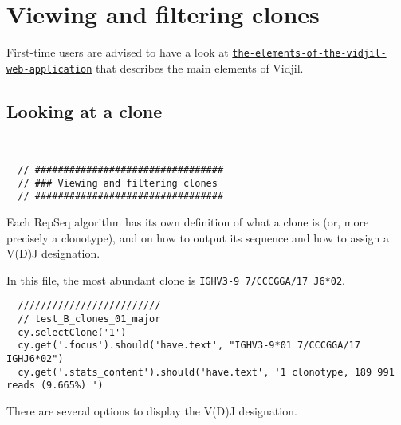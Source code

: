 \section{Viewing and filtering clones}

First-time users are advised to have a look at \href{https://www.vidjil.org/doc/user/#the-elements-of-the-vidjil-web-application}{\tt the-elements-of-the-vidjil-web-application} that describes the main elements of Vidjil.

\subsection{Looking at a clone}
\begin{verbatim}


  // #################################
  // ### Viewing and filtering clones
  // #################################

\end{verbatim}


Each RepSeq algorithm has its own definition of what a clone is (or, more precisely
a clonotype), and on how to output its sequence and how to assign a V(D)J designation.

In this file, the most abundant clone
is \texttt{IGHV3-9 7/CCCGGA/17 J6*02}.



\begin{verbatim}
  /////////////////////////
  // test_B_clones_01_major
  cy.selectClone('1')
  cy.get('.focus').should('have.text', "IGHV3-9*01 7/CCCGGA/17 IGHJ6*02")
  cy.get('.stats_content').should('have.text', '1 clonotype, 189 991 reads (9.665%) ')

\end{verbatim}


There are several options to display the V(D)J designation.


